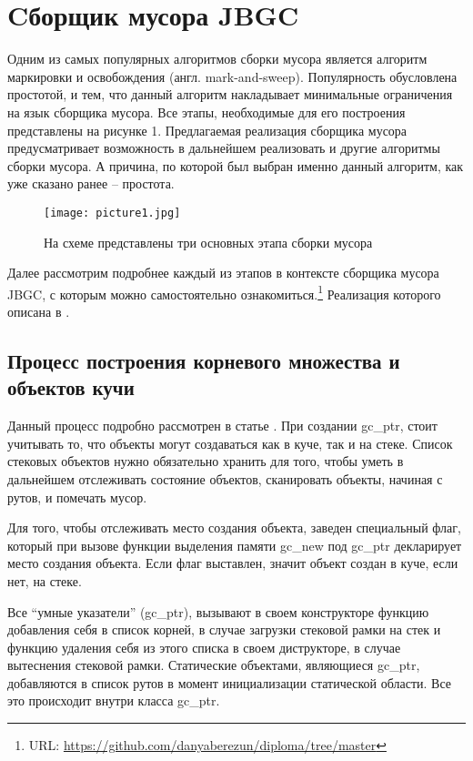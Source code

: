 \section{Cборщик мусора JBGC}

Одним из самых популярных алгоритмов сборки мусора является  алгоритм маркировки и 
освобождения (англ. mark-and-sweep). Популярность обусловлена простотой, и тем, что 
данный алгоритм накладывает минимальные ограничения на язык сборщика мусора. Все этапы, 
необходимые для его построения представлены на рисунке 1.  Предлагаемая реализация сборщика 
мусора предусматривает возможность в дальнейшем реализовать и другие алгоритмы сборки мусора.  
А причина, по которой был выбран именно данный алгоритм, как уже сказано ранее -- простота.

\begin{figure}[h!]
	\centering
	\texttt{[image: picture1.jpg]}
	\caption{На схеме представлены три основных этапа сборки мусора}
	\centering
\end{figure}

Далее рассмотрим подробнее каждый из этапов в контексте сборщика мусора JBGC,  с которым можно 
самостоятельно ознакомиться.\footnote{URL: \url{https://github.com/danyaberezun/diploma/tree/master}} 
Реализация которого описана в \cite{realisation}.

\subsection{Процесс построения корневого множества и объектов кучи}

Данный процесс подробно рассмотрен в статье \cite{roots}. При создании gc\_ptr, стоит учитывать то, 
что объекты могут создаваться как в куче, так и на стеке. Список стековых объектов  нужно обязательно 
хранить для того, чтобы уметь в дальнейшем отслеживать состояние объектов, сканировать объекты, начиная 
с рутов, и помечать мусор. 

Для того, чтобы отслеживать место создания объекта, заведен специальный флаг, который при вызове функции 
выделения памяти gc\_new  под gc\_ptr декларирует место создания объекта. Если флаг выставлен, значит 
объект создан в куче, если нет, на стеке.

Все ``умные указатели'' (gc\_ptr), вызывают в своем конструкторе функцию добавления себя в список корней, 
в случае загрузки стековой рамки на стек и функцию удаления себя из этого списка в своем диструкторе, в 
случае вытеснения стековой рамки. Статические объектами, являющиеся gc\_ptr, добавляются в список рутов в 
момент инициализации статической области. Все это происходит внутри класса gc\_ptr.

